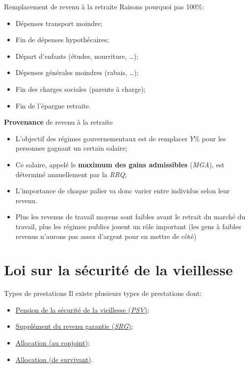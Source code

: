 \documentclass[10pt, french]{article}
\begin{document}
\begin{multicols*}{3}
\begin{conceptgen}{Remplacement de revenu à la retraite}
Raisons pourquoi pas 100\%:
\begin{itemize}[leftmargin = *]
	\item	Dépenses transport moindre;
	\item	Fin de dépenses hypothécaires;
	\item	Départ d'enfants (études, nourriture, \dots);
	\item	Dépenses générales moindres (rabais, \dots);
	\item	Fin des charges sociales (parents à charge);
	\item	Fin de l'épargne retraite.
\end{itemize}
\tcbline
\textbf{Provenance} de revenu à la retraite
\begin{itemize}[leftmargin = *]
	\item	L'objectif des régimes gouvernementaux est de remplacer $Y\%$ pour les personnes gagnant un certain salaire;
	\item	Ce salaire, appelé le \textbf{maximum des gains admissibles} (\textit{MGA}), est déterminé annuellement par la \textit{RRQ};
	\item	L'importance de chaque palier va donc varier entre individus selon leur revenu.
	\item[] Plus les revenus de travail moyens sont faibles avant le retrait du marché du travail, plus les régimes publics jouent un rôle important (les gens à faibles revenus n'aurons pas assez d'argent pour en mettre de côté) 
\end{itemize}
\end{conceptgen}

\newpage

\section{Loi sur la sécurité de la vieillesse}
\begin{conceptgen}{Types de prestations}
Il existe plusieurs types de prestations dont:
\begin{itemize}[leftmargin =  *]
	\item	\hyperref[sec:PSV]{Pension de la sécurité de la vieillesse (\textit{PSV})};
	\item	\hyperref[sec:SRG]{Supplément du revenu garantie (\textit{SRG})};
	\item	\hyperref[sec:Alloc]{Allocation (au conjoint)};
	\item	\hyperref[sec:Alloc_survival]{Allocation (de survivant)}.
\end{itemize}
\end{conceptgen}


\end{multicols*}
\end{document}
